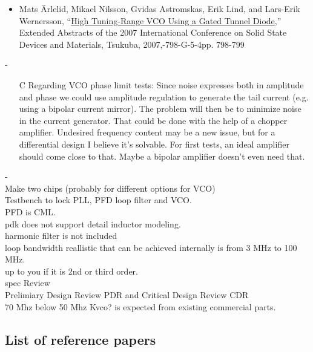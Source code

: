 \documentclass{article}
\begin{document}
\begin{itemize}
	\item Mats Ärlelid, Mikael Nilsson, Gvidas Astromskas, Erik Lind, and Lars-Erik Wernersson, “\href{https://confit.atlas.jp/guide/event-img/ssdm2007/G-5-4/public/pdf_archive?type=in}{High Tuning-Range VCO Using a Gated Tunnel Diode},” Extended Abstracts of the 2007 International Conference on Solid State Devices and Materials, Tsukuba, 2007,-798-G-5-4pp. 798-799
\end{itemize}
-
\begin{itemize}
	\item [C] Regarding VCO phase limit tests: Since noise expresses both in amplitude and phase we could use amplitude regulation to generate the tail current (e.g. using a bipolar current mirror). The problem will then be to minimize noise in the current generator. That could be done with the help of a chopper amplifier. Undesired frequency content may be a new issue, but for a differential design I believe it's solvable. For first tests, an ideal amplifier should come close to that. Maybe a bipolar amplifier doesn't even need that. 
\end{itemize}

-
\\
Make two chips (probably for different options for VCO)
\\
Testbench to lock PLL, PFD loop filter and VCO.
\\

PFD is CML.
\\

pdk does not support detail inductor modeling.
\\

harmonic filter is not included
\\

loop bandwidth reallistic that can be achieved internally is from 3 MHz to 100 MHz.
\\

up to you if it is 2nd or third order.
\\

spec Review
\\

Prelimiary Design Review PDR and Critical Design Review CDR
\\

70 Mhz below 50 Mhz Kvco? is expected from existing commercial parts.
\\

\subsection{List of reference papers} %
\end{document}
